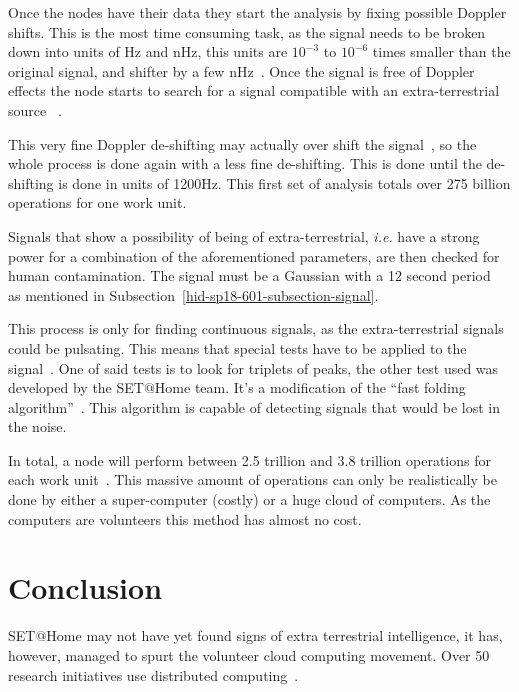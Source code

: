 Once the nodes have their data they start the analysis by fixing possible 
Doppler shifts. This is the most time consuming task, as the signal needs to be 
broken down into units of Hz and nHz, this units are $10^{-3}$ to $10^{-6}$ 
times smaller than the original signal, and shifter by a few 
nHz~\cite{hid-sp18-601-www-sathome-howworks}. Once the signal is free of Doppler
 effects the node starts to search for a signal compatible with an 
extra-terrestrial source
~\cite{hid-sp18-601-www-sathome-howworks,hid-sp18-601-paper-cocconi1959searching}.

This very fine Doppler de-shifting may actually over shift the 
signal~\cite{hid-sp18-601-www-sathome-howworks}, so the whole
process is done again with a less fine de-shifting. This is done until the 
de-shifting
is done in units of 1200Hz. This first set of analysis totals over 275 billion 
operations for one work unit.

Signals that show a possibility of being of extra-terrestrial, \textit{i.e.} 
have a strong power for a combination of the aforementioned parameters, are then 
 checked for human contamination. The signal must be 
a Gaussian with a 12 second period~\cite{hid-sp18-601-paper-anderson2002seti} as
mentioned in Subsection~\ref{hid-sp18-601-subsection-signal}.

This process is only for finding continuous signals, as the extra-terrestrial 
signals could be pulsating. This means that special tests have to be applied 
to the signal~\cite{hid-sp18-601-www-sathome-howworks}. One of said tests is 
to look for triplets of peaks, the other test
used was developed by the SET$@$Home team. It's a modification of the 
``fast folding algorithm''~\cite{hid-sp18-601-paper-korpela2001seti}.
This algorithm is capable of detecting signals that would be lost in the noise.

In total, a node will perform between 2.5 trillion and 3.8 trillion operations 
for each work unit~\cite{hid-sp18-601-www-sathome-howworks}. 
This massive amount of operations can only be realistically 
be done by either a super-computer (costly) or a huge cloud of computers. As the
 computers are volunteers this method has almost no cost.

\section{Conclusion}\label{hid-sp18-601-section-conclusions}

SET$@$Home may not have yet found signs of extra terrestrial intelligence, it 
has, however, managed to spurt the volunteer cloud computing movement. Over 50
research initiatives use distributed 
computing~\cite{hid-sp18-601-www-boinc-projects}.

